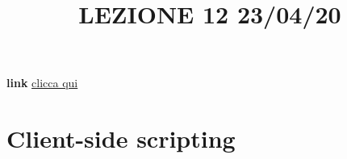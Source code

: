 \title{LEZIONE 12 23/04/20}
\textbf{link} \href{https://web.microsoftstream.com/video/55f4d4bd-8efe-48d2-870d-78b0a6baa77d?list=user&userId=cfe0965d-9a7c-40e2-be6e-f078296a1914}{clicca qui}
\section{Client-side scripting}